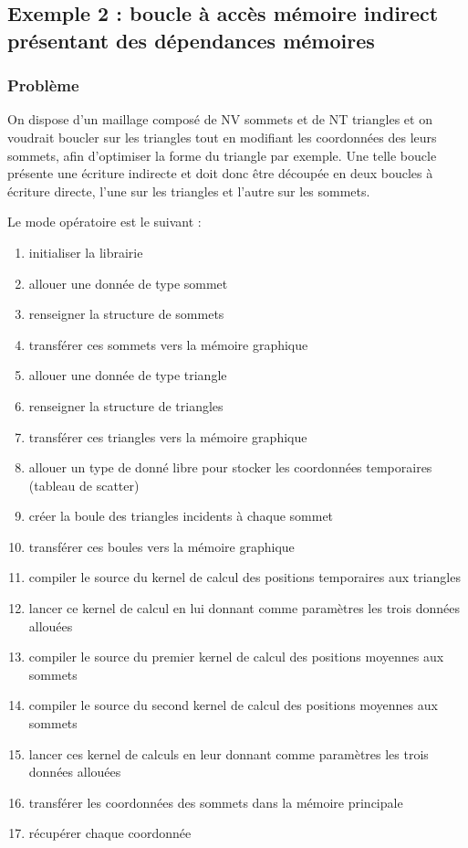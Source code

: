 \documentclass[a4paper,12pt]{article}
\begin{document}
\subsection{Exemple 2 : boucle à accès mémoire indirect présentant des dépendances mémoires}
\label{ex2}
\subsubsection{Problème}
On dispose d'un maillage composé de NV sommets et de NT triangles et on voudrait boucler sur les triangles tout en modifiant les coordonnées des leurs sommets, afin d'optimiser la forme du triangle par exemple. Une telle boucle présente une écriture indirecte et doit donc être découpée en deux boucles à écriture directe, l'une sur les triangles et l'autre sur les sommets.

Le mode opératoire est le suivant :
\begin{enumerate}
\item initialiser la librairie
\item allouer une donnée de type sommet
\item renseigner la structure de sommets
\item transférer ces sommets vers la mémoire graphique
\item allouer une donnée de type triangle
\item renseigner la structure de triangles
\item transférer ces triangles vers la mémoire graphique
\item allouer un type de donné libre pour stocker les coordonnées temporaires (tableau de scatter)
\item créer la boule des triangles incidents à chaque sommet
\item transférer ces boules vers la mémoire graphique
\item compiler le source du kernel de calcul des positions temporaires aux triangles
\item lancer ce kernel de calcul en lui donnant comme paramètres les trois données allouées
\item compiler le source du premier kernel de calcul des positions moyennes aux sommets
\item compiler le source du second kernel de calcul des positions moyennes aux sommets
\item lancer ces kernel de calculs en leur donnant comme paramètres les trois données allouées
\item transférer les coordonnées des sommets dans la mémoire principale
\item récupérer chaque coordonnée
\end{enumerate}
\end{document}
